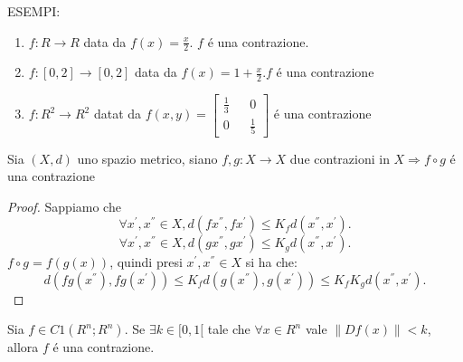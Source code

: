 ESEMPI:\\
\begin{enumerate}
	\item $f: R \rightarrow R$ data da $f(x) = \frac{x}{2}$. $f$ \'e una contrazione.
	\item $f: [0,2] \rightarrow [0,2]$ data da $f(x) = 1+\frac{x}{2}. f$ \'e una contrazione
	\item $f: R^2 \rightarrow R^2$ datat da $f(x,y)=\begin{bmatrix} \frac{1}{3}&&0\\0&&\frac{1}{5}\end{bmatrix}$ \'e una contrazione
\end{enumerate}

\proposition
Sia $(X, d)$ uno spazio metrico, siano $f,g:X\rightarrow X$ due contrazioni in $X \Rightarrow f\circ g$ \'e una contrazione
\begin{proof}
	Sappiamo che\\
	$$\forall x^{'},x^{''}\in X, d(fx^{''}, fx^{'})\le K_fd(x^{''}, x^{'}).$$
	$$\forall x^{'},x^{''}\in X, d(gx^{''}, gx^{'})\le K_gd(x^{''}, x^{'}).$$
	$f\circ g=f(g(x))$, quindi presi $x^{'},x^{''}\in X$ si ha che: $$d(fg(x^{''}), fg(x^{'}))\le K_fd(g(x^{''}), g(x^{'}))\le K_fK_gd(x^{''},x^{'}).$$
\end{proof}

\proposition
Sia $f \in C1(R^n;R^n)$. Se $\exists k \in [0, 1[$ tale che $\forall x \in R^n$ vale $\left\| Df(x)\right\|  < k$, allora $f$ \'e una contrazione.

